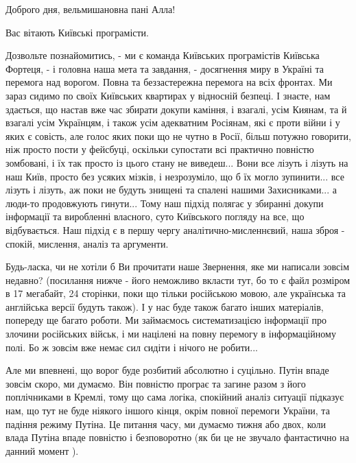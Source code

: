  
 
 
 
 

Доброго дня, вельмишановна пані Алла!

Вас вітають Київські програмісти.

Дозвольте познайомитись, - ми є команда Київських програмістів Київська
Фортеця, - і головна наша мета та завдання, - досягнення миру в Україні та
перемога над ворогом.  Повна та беззастережна перемога на всіх фронтах. Ми
зараз сидимо по своїх Київських квартирах у відносній безпеці. І знаєте, нам
здається, що настав вже час збирати докупи каміння, і взагалі, усім Киянам, та
й взагалі усім Українцям, і також усім адекватним Росіянам, які є проти війни і
у яких є совість, але голос яких поки що не чутно в Росії, більш потужно
говорити, ніж просто пости у фейсбуці, оскільки супостати всі практично
повністю зомбовані, і їх так просто із цього стану не виведеш... Вони все
лізуть і лізуть на наш Київ, просто без усяких мізків, і незрозуміло, що б їх могло
зупинити... все лізуть і лізуть, аж поки не будуть знищені та спалені нашими
Захисниками... а люди-то продовжують гинути...  Тому наш підхід полягає у
збиранні докупи інформації та виробленні власного, суто Київського погляду на
все, що відбувається. Наш підхід є в першу чергу аналітично-мисленнєвий, наша
зброя - спокій, мислення, аналіз та аргументи.

Будь-ласка, чи не хотіли б Ви прочитати наше Звернення, яке ми написали зовсім
недавно?  (посилання нижче - його неможливо вкласти тут, бо то є файл розміром
в 17 мегабайт, 24 сторінки, поки що тільки російською мовою, але українська та
англійська версії будуть також). І у нас буде також багато інших матеріалів,
попереду ще багато роботи. Ми займаємось систематизацією інформації про злочини
російських військ, і ми націлені на повну перемогу в інформаційному полі. Бо ж
зовсім вже немає сил сидіти і нічого не робити...

Але ми впевнені, що ворог буде розбитий абсолютно і суцільно. Путін впаде
зовсім скоро, ми думаємо.  Він повністю програє та загине разом з його
поплічниками в Кремлі, тому що сама логіка, спокійний аналіз ситуації підказує
нам, що тут не буде ніякого іншого кінця, окрім повної перемоги України, та
падіння режиму Путіна. Це питання часу, ми думаємо тижня або двох, коли влада
Путіна впаде повністю і безповоротно (як би це не звучало фантастично на данний
момент ).

